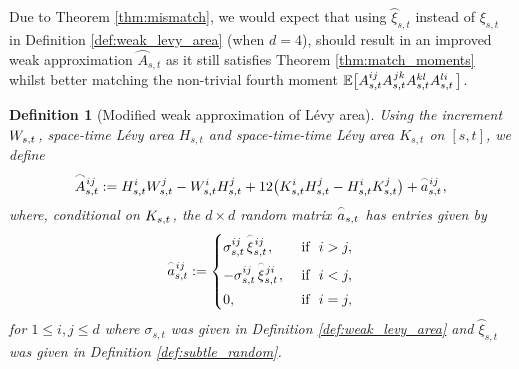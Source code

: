 \documentclass[sn-mathphys-num]{sn-jnl}%
\newtheorem{definition}{Definition}%
\newcommand{\E}{\mathbb{E}}
\newcommand{\m}{\hspace{0.25mm}}
\begin{document}
Due to Theorem \ref{thm:mismatch}, we would expect that using $\wideparen{\xi}_{s,t}$ instead of $\xi_{s,t}$ in Definition \ref{def:weak_levy_area} (when $d=4$), should result in an improved weak approximation $\wideparen{A}_{s,t}$ as it still satisfies Theorem \ref{thm:match_moments} whilst better matching the non-trivial fourth moment $\E\big[A_{s,t}^{ij}A_{s,t}^{\m jk}A_{s,t}^{kl}A_{s,t}^{li}\,\big]$.\medbreak

\begin{definition}[Modified weak approximation of L\'{e}vy area]
Using the increment $W_{s,t}\m$, space-time L\'{e}vy area $H_{s,t}$ and space-time-time L\'{e}vy area $K_{s,t}$ on $[s,t]$, we define
\begin{align}\label{eq:weak_levy_area2}
\wideparen{A}_{s,t}^{\m ij} := H_{s,t}^i W_{s,t}^j - W_{s,t}^i H_{s,t}^j + 12\big(K_{s,t}^i H_{s,t}^j - H_{s,t}^i K_{s,t}^j\big) + \wideparen{a}_{s,t}^{\m ij}\m,
\end{align}
where, conditional on $K_{s,t}\m$, the $d\times d$ random matrix $\m\wideparen{a}_{s,t}\m$ has entries given by
\begin{align*}
\wideparen{a}_{s,t}^{\m ij} := \begin{cases}\sigma_{s,t}^{ij}\, \wideparen{\xi}_{s,t}^{\m ij}\m, & \text{ if }\,\, i > j,\\[3pt]
-\sigma_{s,t}^{ij}\, \wideparen{\xi}_{s,t}^{\m ji}\m, & \text{ if }\,\, i < j,\\[3pt]
0, & \text{ if }\,\,i = j,
\end{cases}
\end{align*}
for $1\leq i,j\leq d$ where $\sigma_{s,t}$ was given in Definition \ref{def:weak_levy_area} and $\wideparen{\xi}_{s,t}$ was given in Definition \ref{def:subtle_random}.
\end{definition}
\end{document}
